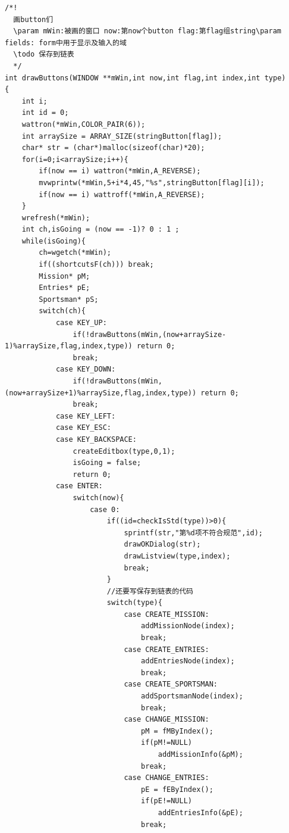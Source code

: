 \documentclass[10pt,a4paper]{article}
\begin{document}
\begin{footnotesize}
\begin{verbatim}
/*!
  画button们
  \param mWin:被画的窗口 now:第now个button flag:第flag组string\param fields: form中用于显示及输入的域
  \todo 保存到链表
  */
int drawButtons(WINDOW **mWin,int now,int flag,int index,int type)
{
    int i;
    int id = 0;
    wattron(*mWin,COLOR_PAIR(6));
    int arraySize = ARRAY_SIZE(stringButton[flag]);
    char* str = (char*)malloc(sizeof(char)*20);
    for(i=0;i<arraySize;i++){
        if(now == i) wattron(*mWin,A_REVERSE);
        mvwprintw(*mWin,5+i*4,45,"%s",stringButton[flag][i]);
        if(now == i) wattroff(*mWin,A_REVERSE);
    }
    wrefresh(*mWin);
    int ch,isGoing = (now == -1)? 0 : 1 ;
    while(isGoing){
        ch=wgetch(*mWin);
        if((shortcutsF(ch))) break;
        Mission* pM;
        Entries* pE;
        Sportsman* pS;
        switch(ch){
            case KEY_UP:
                if(!drawButtons(mWin,(now+arraySize-1)%arraySize,flag,index,type)) return 0;
                break;
            case KEY_DOWN:
                if(!drawButtons(mWin,(now+arraySize+1)%arraySize,flag,index,type)) return 0;
                break;
            case KEY_LEFT:
            case KEY_ESC:
            case KEY_BACKSPACE:
                createEditbox(type,0,1);
                isGoing = false;
                return 0;
            case ENTER:
                switch(now){
                    case 0:
                        if((id=checkIsStd(type))>0){
                            sprintf(str,"第%d项不符合规范",id);
                            drawOKDialog(str); 
                            drawListview(type,index);
                            break;
                        }
                        //还要写保存到链表的代码
                        switch(type){
                            case CREATE_MISSION:
                                addMissionNode(index);
                                break;
                            case CREATE_ENTRIES:
                                addEntriesNode(index);
                                break;
                            case CREATE_SPORTSMAN:
                                addSportsmanNode(index);
                                break;
                            case CHANGE_MISSION:
                                pM = fMByIndex();
                                if(pM!=NULL)
                                    addMissionInfo(&pM);
                                break;
                            case CHANGE_ENTRIES:
                                pE = fEByIndex();
                                if(pE!=NULL)
                                    addEntriesInfo(&pE);
                                break;

\end{verbatim}
\end{footnotesize}
\end{document}
